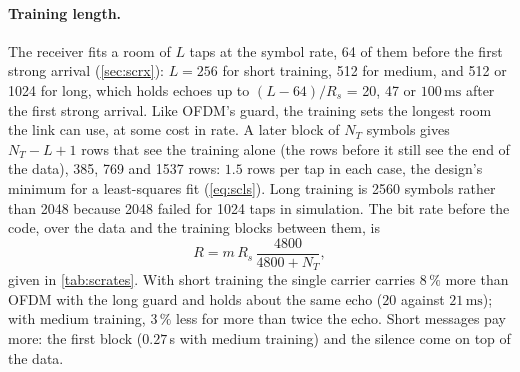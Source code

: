 \documentclass[11pt,a4paper]{article}
\newcommand{\ms}{\,\mathrm{ms}}
\theoremstyle{remark}
\begin{document}
\paragraph{Training length.}
The receiver fits a room of $L$ taps at the symbol rate, 64 of them before the first strong arrival (\cref{sec:scrx}): $L = 256$ for short training, 512 for medium, and 512 or 1024 for long, which holds echoes up to $(L - 64)/R_s$ = 20, 47 or $100\ms$ after the first strong arrival. Like OFDM's guard, the training sets the longest room the link can use, at some cost in rate. A later block of $N_T$ symbols gives $N_T - L + 1$ rows that see the training alone (the rows before it still see the end of the data), 385, 769 and 1537 rows: $1.5$ rows per tap in each case, the design's minimum for a least-squares fit (\cref{eq:scls}). Long training is 2560 symbols rather than 2048 because 2048 failed for 1024 taps in simulation. The bit rate before the code, over the data and the training blocks between them, is
\begin{equation}
R = m\, R_s\, \frac{4800}{4800 + N_T},
\end{equation}
given in \cref{tab:scrates}. With short training the single carrier carries $8\,\%$ more than OFDM with the long guard and holds about the same echo ($20$ against $21\ms$); with medium training, $3\,\%$ less for more than twice the echo. Short messages pay more: the first block ($0.27$\,s with medium training) and the silence come on top of the data.
\end{document}
